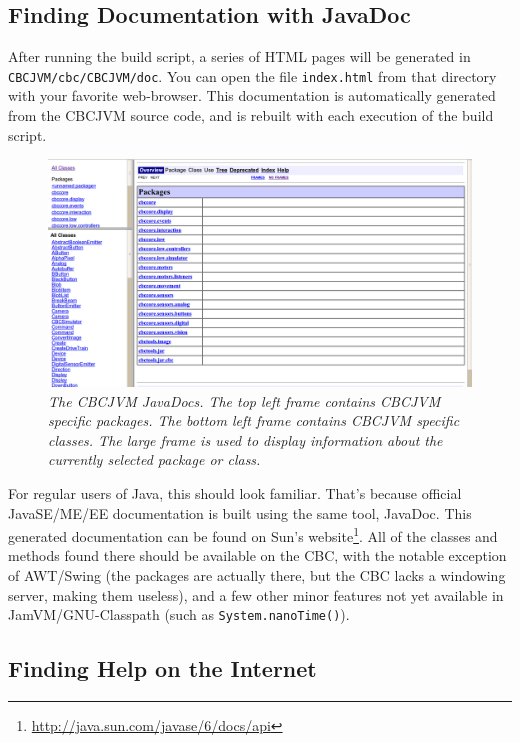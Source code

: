 \documentclass[12pt,letterpaper]{article}
\newcommand{\urlfootnote}[1]{\footnote{\url{#1}}}
\begin{document}
\subsection{Finding Documentation with JavaDoc}

After running the build script, a series of HTML pages will be generated in \texttt{CBCJVM/cbc/CBCJVM/doc}. You can open the file \texttt{index.html} from that directory with your favorite web-browser. This documentation is automatically generated from the CBCJVM source code, and is rebuilt with each execution of the build script.

\begin{figure}[h]
\includegraphics[width=\textwidth]{javadocs.png}
\caption{\textit{The CBCJVM JavaDocs. The top left frame contains CBCJVM specific packages. The bottom left frame contains CBCJVM specific classes. The large frame is used to display information about the currently selected package or class.}}
\end{figure}

For regular users of Java, this should look familiar. That's because official JavaSE/ME/EE documentation is built using the same tool, JavaDoc. This generated documentation can be found on Sun's website\urlfootnote{http://java.sun.com/javase/6/docs/api}. All of the classes and methods found there should be available on the CBC, with the notable exception of AWT/Swing (the packages are actually there, but the CBC lacks a windowing server, making them useless), and a few other minor features not yet available in JamVM/GNU-Classpath (such as \texttt{System.nanoTime()}).



\subsection{Finding Help on the Internet}
\end{document}
